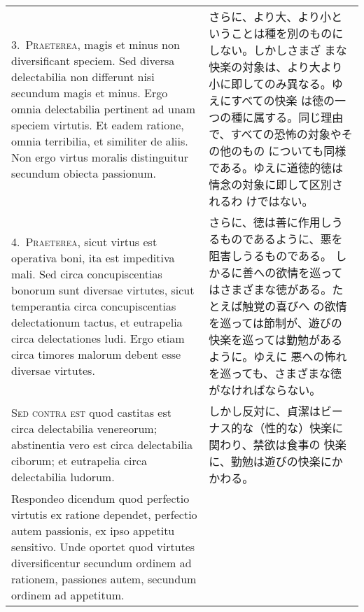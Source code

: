 \documentclass[10pt]{jsarticle}
\begin{document}
\begin{longtable}{p{21em}p{21em}}
\\




3.~{\scshape Praeterea}, magis et minus non diversificant speciem. Sed
diversa delectabilia non differunt nisi secundum magis et minus. Ergo
omnia delectabilia pertinent ad unam speciem virtutis. Et eadem
ratione, omnia terribilia, et similiter de aliis. Non ergo virtus
moralis distinguitur secundum obiecta passionum.
 
&

 さらに、より大、より小ということは種を別のものにしない。しかしさまざ
 まな快楽の対象は、より大より小に即してのみ異なる。ゆえにすべての快楽
 は徳の一つの種に属する。同じ理由で、すべての恐怖の対象やその他のもの
 についても同様である。ゆえに道徳的徳は情念の対象に即して区別されるわ
 けではない。
 
\\




4.~{\scshape Praeterea}, sicut virtus est operativa boni, ita est
impeditiva mali. Sed circa concupiscentias bonorum sunt diversae
virtutes, sicut temperantia circa concupiscentias delectationum
tactus, et eutrapelia circa delectationes ludi. Ergo etiam circa
timores malorum debent esse diversae virtutes.
 
&

 さらに、徳は善に作用しうるものであるように、悪を阻害しうるものである。
 しかるに善への欲情を巡ってはさまざまな徳がある。たとえば触覚の喜びへ
 の欲情を巡っては節制が、遊びの快楽を巡っては勤勉があるように。ゆえに
 悪への怖れを巡っても、さまざまな徳がなければならない。

 
\\




{\scshape Sed contra est} quod castitas est circa delectabilia
venereorum; abstinentia vero est circa delectabilia ciborum; et
eutrapelia circa delectabilia ludorum.
 
&

 しかし反対に、貞潔はビーナス的な（性的な）快楽に関わり、禁欲は食事の
 快楽に、勤勉は遊びの快楽にかかわる。

 
\\



 Respondeo dicendum quod perfectio virtutis ex ratione dependet,
 perfectio autem passionis, ex ipso appetitu sensitivo. Unde oportet
 quod virtutes diversificentur secundum ordinem ad rationem, passiones
 autem, secundum ordinem ad appetitum.




\end{longtable}
\end{document}
